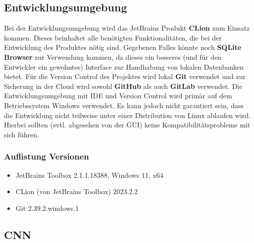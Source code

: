 \subsection{Entwicklungsumgebung}
\label{sec:AnalyseEntwicklungsumgebung}
Bei der Entwicklungsumgebung wird das JetBrains Produkt \textbf{CLion} zum Einsatz kommen. Dieses beinhaltet alle benötigten Funktionalitäten, die bei der Entwicklung des Produktes nötig sind. Gegebenen Falles könnte noch \textbf{SQLite Browser} zur Verwendung kommen, da dieses ein besseres (und für den Entwickler ein gewohntes) Interface zur Handhabung von lokalen Datenbanken bietet. Für die Version Control des Projektes wird lokal \textbf{Git} verwendet und zur Sicherung in der Cloud wird sowohl \textbf{GitHub} als auch \textbf{GitLab} verwendet. Die Entwicklungsumgebung mit IDE und Version Control wird primär auf dem Betriebssystem Windows verwendet. Es kann jedoch nicht garantiert sein, dass die Entwicklung nicht teilweise unter einer Distribution von Linux ablaufen wird. Hierbei sollten (evtl. abgesehen von der GUI) keine Kompatibilitätsprobleme mit sich führen. 
\subsubsection{Auflistung Versionen}
\label{sec:AnalyseDevEnvAuflistung}
\begin{itemize}
\item JetBrains Toolbox 2.1.1.18388, Windows 11, x64
\item CLion (von JetBrains Toolbox) 2023.2.2
\item Git 2.39.2.windows.1
\end{itemize}

\subsection{CNN}
\label{sec:AnalyseCNN}
